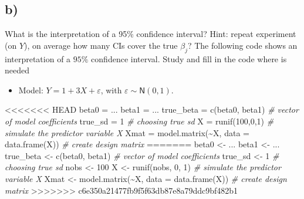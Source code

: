 \documentclass[
]{article}
\newenvironment{Shaded}{\begin{snugshade}}{\end{snugshade}}
\newcommand{\AttributeTok}[1]{\textcolor[rgb]{0.77,0.63,0.00}{#1}}
\newcommand{\CommentTok}[1]{\textcolor[rgb]{0.56,0.35,0.01}{\textit{#1}}}
\newcommand{\DecValTok}[1]{\textcolor[rgb]{0.00,0.00,0.81}{#1}}
\newcommand{\FunctionTok}[1]{\textcolor[rgb]{0.00,0.00,0.00}{#1}}
\newcommand{\NormalTok}[1]{#1}
\newcommand{\OtherTok}[1]{\textcolor[rgb]{0.56,0.35,0.01}{#1}}
\newcommand{\SpecialCharTok}[1]{\textcolor[rgb]{0.00,0.00,0.00}{#1}}
\providecommand{\tightlist}{%
  \setlength{\itemsep}{0pt}\setlength{\parskip}{0pt}}
\begin{document}
\hypertarget{b-1}{%
\subsection{b)}\label{b-1}}

What is the interpretation of a 95\% confidence interval? Hint: repeat
experiment (on \(Y\)), on average how many CIs cover the true
\(\beta_j\)? The following code shows an interpretation of a \(95\%\)
confidence interval. Study and fill in the code where is needed

\begin{itemize}
\tightlist
\item
  Model: \(Y = 1 + 3X + \varepsilon\), with
  \(\varepsilon \sim \mathsf{N}(0,1)\).
\end{itemize}

\begin{Shaded}
\begin{Highlighting}[]
<<<<<<< HEAD
\NormalTok{beta0 }\OtherTok{=}\NormalTok{ ...}
\NormalTok{beta1 }\OtherTok{=}\NormalTok{ ...}
\NormalTok{true\_beta }\OtherTok{=} \FunctionTok{c}\NormalTok{(beta0, beta1) }\CommentTok{\# vector of model coefficients}
\NormalTok{true\_sd }\OtherTok{=} \DecValTok{1} \CommentTok{\# choosing true sd}
\NormalTok{X }\OtherTok{=} \FunctionTok{runif}\NormalTok{(}\DecValTok{100}\NormalTok{,}\DecValTok{0}\NormalTok{,}\DecValTok{1}\NormalTok{) }\CommentTok{\# simulate the predictor variable X}
\NormalTok{Xmat }\OtherTok{=} \FunctionTok{model.matrix}\NormalTok{(}\SpecialCharTok{\textasciitilde{}}\NormalTok{X, }\AttributeTok{data =} \FunctionTok{data.frame}\NormalTok{(X)) }\CommentTok{\# create design matrix}
=======
\NormalTok{beta0 }\OtherTok{\textless{}{-}}\NormalTok{ ...}
\NormalTok{beta1 }\OtherTok{\textless{}{-}}\NormalTok{ ...}
\NormalTok{true\_beta }\OtherTok{\textless{}{-}} \FunctionTok{c}\NormalTok{(beta0, beta1) }\CommentTok{\# vector of model coefficients}
\NormalTok{true\_sd }\OtherTok{\textless{}{-}} \DecValTok{1} \CommentTok{\# choosing true sd}
\NormalTok{nobs }\OtherTok{\textless{}{-}} \DecValTok{100}
\NormalTok{X }\OtherTok{\textless{}{-}} \FunctionTok{runif}\NormalTok{(nobs, }\DecValTok{0}\NormalTok{, }\DecValTok{1}\NormalTok{) }\CommentTok{\# simulate the predictor variable X}
\NormalTok{Xmat }\OtherTok{\textless{}{-}} \FunctionTok{model.matrix}\NormalTok{(}\SpecialCharTok{\textasciitilde{}}\NormalTok{X, }\AttributeTok{data =} \FunctionTok{data.frame}\NormalTok{(X)) }\CommentTok{\# create design matrix}
>>>>>>> c6e350a21477fb9f5f63db87e8a79ddc9bf482b1


\end{Highlighting}
\end{Shaded}
\end{document}
